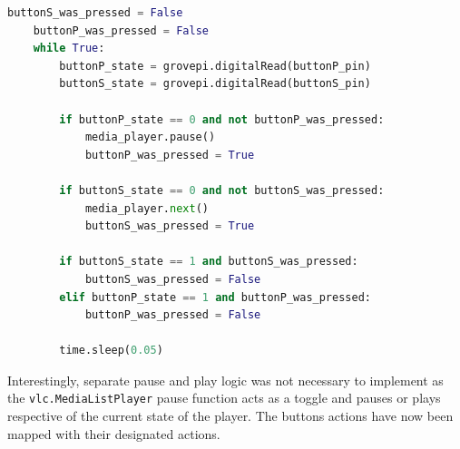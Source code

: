 \begin{algorithm}[H]
  \caption{Mapped Button Presses - Python}
  \label{alg:mappedBtnPress}
  \begin{lstlisting}[language=Python]
    buttonS_was_pressed = False
    buttonP_was_pressed = False
    while True:
        buttonP_state = grovepi.digitalRead(buttonP_pin)
        buttonS_state = grovepi.digitalRead(buttonS_pin)
        
        if buttonP_state == 0 and not buttonP_was_pressed:
            media_player.pause()
            buttonP_was_pressed = True
            
        if buttonS_state == 0 and not buttonS_was_pressed:
            media_player.next()
            buttonS_was_pressed = True
            
        if buttonS_state == 1 and buttonS_was_pressed:
            buttonS_was_pressed = False  
        elif buttonP_state == 1 and buttonP_was_pressed:
            buttonP_was_pressed = False

        time.sleep(0.05)
  \end{lstlisting}
\end{algorithm}
Interestingly, separate pause and play logic was not necessary to implement as the \texttt{vlc.MediaListPlayer} pause function acts as a toggle and pauses or plays respective of the current state of the player. The buttons actions have now been mapped with their designated actions.

